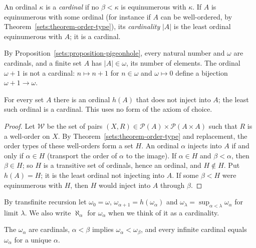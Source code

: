 \begin{definition}\label{sets:definition-cardinal}
An ordinal $\kappa$ is a \emph{cardinal} if no $\beta < \kappa$ is equinumerous
with $\kappa$. If $A$ is equinumerous with some ordinal (for instance if $A$
can be well-ordered, by Theorem~\ref{sets:theorem-order-type}), its
\emph{cardinality} $|A|$ is the least ordinal equinumerous with $A$; it is a
cardinal.
\end{definition}

\begin{example}\label{sets:example-cardinals}
By Proposition~\ref{sets:proposition-pigeonhole}, every natural number and
$\omega$ are cardinals, and a finite set $A$ has $|A| \in \omega$, its number of
elements. The ordinal $\omega + 1$ is not a cardinal: $n \mapsto n + 1$ for
$n \in \omega$ and $\omega \mapsto 0$ define a bijection $\omega + 1 \to \omega$.
\end{example}

\begin{theorem}[Hartogs]\label{sets:theorem-hartogs}
For every set $A$ there is an ordinal $h(A)$ that does not inject into $A$;
the least such ordinal is a cardinal. This uses no form of the axiom of
choice.
\end{theorem}

\begin{proof}
Let $\mathcal{W}$ be the set of pairs $(X, R) \in \mathcal{P}(A) \times \mathcal{P}(A \times A)$
such that $R$ is a well-order on $X$. By Theorem~\ref{sets:theorem-order-type}
and replacement, the order types of these well-orders form a set $H$. An
ordinal $\alpha$ injects into $A$ if and only if $\alpha \in H$ (transport the
order of $\alpha$ to the image). If $\alpha \in H$ and $\beta < \alpha$, then
$\beta \in H$; so $H$ is a transitive set of ordinals, hence an ordinal, and
$H \notin H$. Put $h(A) = H$; it is the least ordinal not injecting into $A$.
If some $\beta < H$ were equinumerous with $H$, then $H$ would inject into $A$
through $\beta$.
\end{proof}

\begin{definition}\label{sets:definition-alephs}
By transfinite recursion let $\omega_0 = \omega$, $\omega_{\alpha + 1} = h(\omega_\alpha)$
and $\omega_\lambda = \sup_{\alpha < \lambda} \omega_\alpha$ for limit $\lambda$.
We also write $\aleph_\alpha$ for $\omega_\alpha$ when we think of it as a
cardinality.
\end{definition}

\begin{proposition}\label{sets:proposition-alephs}
The $\omega_\alpha$ are cardinals, $\alpha < \beta$ implies
$\omega_\alpha < \omega_\beta$, and every infinite cardinal equals $\omega_\alpha$
for a unique $\alpha$.
\end{proposition}

